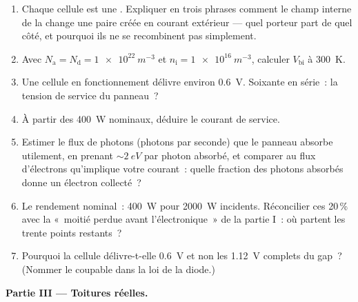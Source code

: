\begin{problem}
\begin{enumerate}[resume]
  \item Chaque cellule est une . Expliquer en trois
        phrases comment le champ interne de la 
        change une paire créée en courant extérieur --- quel
        porteur part de quel côté, et pourquoi ils ne se
        recombinent pas simplement.
  \item Avec $N_{\text{a}} = N_{\text{d}} = \qty{1e22}{m^{-3}}$
        et $n_{\text{i}} = \qty{1e16}{m^{-3}}$, calculer
        $V_{\text{bi}}$ à \qty{300}{K}.
  \item Une cellule en fonctionnement délivre environ
        \qty{0.6}{V}. Soixante en série~: la tension de service du
        panneau~?
  \item À partir des \qty{400}{W} nominaux, déduire le courant de
        service.
  \item Estimer le flux de photons (photons par seconde) que le
        panneau absorbe utilement, en prenant $\sim\qty{2}{eV}$ par
        photon absorbé, et comparer au flux d'électrons qu'implique
        votre courant~: quelle fraction des photons absorbés donne
        un électron collecté~?
  \item Le rendement nominal~: \qty{400}{W} pour
        \qty{2000}{W} incidents. Réconcilier ces 20\,\% avec la
        «~moitié perdue avant l'électronique~» de la partie I~: où
        partent les trente points restants~?
  \item Pourquoi la cellule délivre-t-elle \qty{0.6}{V} et non les
        \qty{1.12}{V} complets du gap~? (Nommer le coupable dans la
        loi de la diode.)
\end{enumerate}

\medskip\noindent\textbf{Partie III --- Toitures réelles.}


\end{problem}
